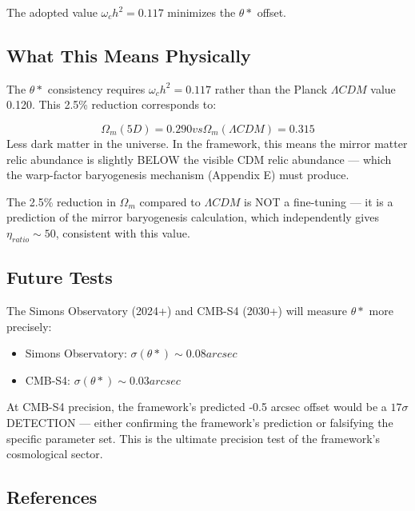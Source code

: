 \documentclass[aps,prd,preprint,superscriptaddress,longbibliography]{revtex4-2}
\begin{document}
The adopted value $\omega_c h^{2} = 0.117$ minimizes the $\theta*$ offset.



\subsection{What This Means Physically}

The $\theta*$ consistency requires $\omega_c h^{2} = 0.117$ rather than the Planck $\Lambda CDM$ value 0.120. This 2.5\% reduction corresponds to:


\begin{equation}
    \Omega_m (5D) = 0.290    vs    \Omega_m (\Lambda CDM) = 0.315
\end{equation}
Less dark matter in the universe. In the framework, this means the mirror matter relic abundance is slightly BELOW the visible CDM relic abundance --- which the warp-factor baryogenesis mechanism (Appendix E) must produce.

The 2.5\% reduction in $\Omega_m$ compared to $\Lambda CDM$ is NOT a fine-tuning --- it is a prediction of the mirror baryogenesis calculation, which independently gives $\eta_{ratio} \sim  50$, consistent with this value.



\subsection{Future Tests}

The Simons Observatory (2024+) and CMB-S4 (2030+) will measure $\theta*$ more precisely:


\begin{itemize}
  \item Simons Observatory: $\sigma(\theta*) \sim  0.08 arcsec$
  \item CMB-S4: $\sigma(\theta*) \sim  0.03 arcsec$
\end{itemize}

At CMB-S4 precision, the framework's predicted -0.5 arcsec offset would be a $17\sigma$ DETECTION --- either confirming the framework's prediction or falsifying the specific parameter set. This is the ultimate precision test of the framework's cosmological sector.



\subsection{References}
\end{document}
